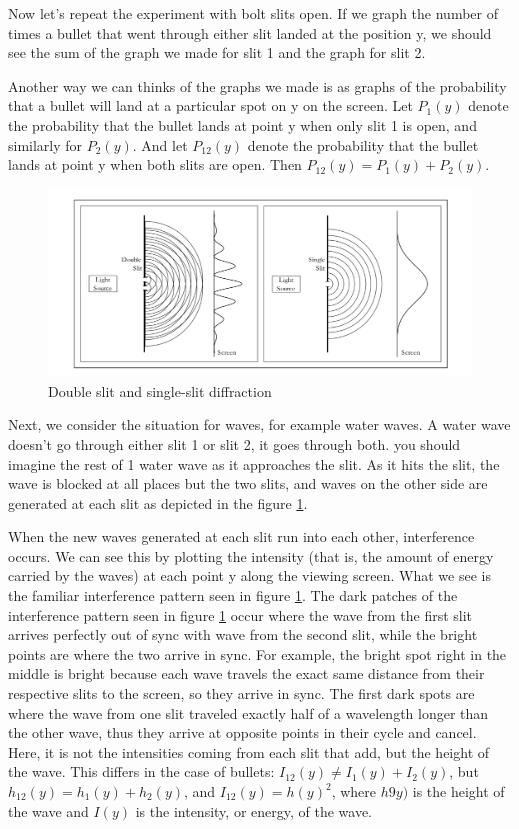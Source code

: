 \documentclass[12pt, oneside]{book}
\theoremstyle{definition}
\theoremstyle{definition}
\theoremstyle{remark}
\begin{document}
Now let's repeat the experiment with bolt slits open. If we graph the number of times a bullet that went through either slit landed at the position y, we should see the sum of the graph we made for slit 1 and the graph for slit 2.

Another way we can thinks of the graphs we made is as graphs of the probability that a bullet will land at a particular spot on y on the screen. Let $P_1(y)$ denote the probability that the bullet lands at point y when only slit 1 is open, and similarly for $P_2(y)$. And let $P_{12}(y)$ denote the probability that the bullet lands at point y when both slits are open. Then $P_{12}(y)=P_1(y)+P_2(y)$.

\begin{figure}
    \centering
    \includegraphics[width=1\linewidth]{../images/Doubleslit.png}
    \caption{Double slit and single-slit diffraction}
    \label{fig:slitexperiment}
\end{figure}

Next, we consider the situation for waves, for example water waves. A water wave doesn't go through either slit 1 or slit 2, it goes through both. you should imagine the rest of 1 water wave as it approaches the slit. As it hits the slit, the wave is blocked at all places but the two slits, and waves on the other side are generated at each slit as depicted in the figure \ref{fig:slitexperiment}.

When the new waves generated at each slit run into each other, interference occurs. We can see this by plotting the intensity (that is, the amount of energy carried by the waves) at each point y along the viewing screen. What we see is the familiar interference pattern seen in figure \ref{fig:slitexperiment}. The dark patches of the interference pattern seen in figure \ref{fig:slitexperiment} occur where the wave from the first slit arrives perfectly out of sync with wave from the second slit, while the bright points are where the two arrive in sync. For example, the bright spot right in the middle is bright because each wave travels the exact same distance from their respective slits to the screen, so they arrive in sync. The first dark spots are where the wave from one slit traveled exactly half of a wavelength longer than the other wave, thus they arrive at opposite points in their cycle and cancel. Here, it is not the intensities coming from each slit that add, but the height of the wave. This differs in the case of bullets: $I_{12}(y)\neq I_1(y)+I_2(y)$, but $h_{12}(y)=h_1(y)+h_2(y)$, and $I_{12}(y)=h(y)^2$, where $h9y)$ is the height of the wave and $I(y)$ is the intensity, or energy, of the wave.
\end{document}
